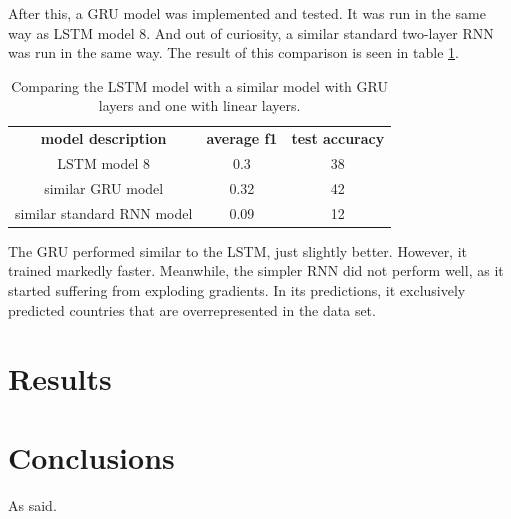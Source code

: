 \documentclass[runningheads]{llncs}
\begin{document}
After this, a GRU model was implemented and tested. It was run in the same way as LSTM model 8. And out of curiosity, a similar standard two-layer RNN was run in the same way. The result of this comparison is seen in table \ref{tab:GRU_LSTM_RNN_comp}.


\begin{table}[h!]
    \begin{center}
        \caption{Comparing the LSTM model with a similar model with GRU layers and one with linear layers.}
        \label{tab:GRU_LSTM_RNN_comp}
		\begin{tabularx}{.8\textwidth}{ | c | c | c |}
			\textbf{model description} & \textbf{average f1} & \textbf{test accuracy} \\
			LSTM model 8 & 0.3 & 38 \\
			similar GRU model & 0.32  & 42 \\
			similar standard RNN model & 0.09 & 12 \\
		\end{tabularx}  
    \end{center}
\end{table}

The GRU performed similar to the LSTM, just slightly better. However, it trained markedly faster. Meanwhile, the simpler RNN did not perform well, as it started suffering from exploding gradients. In its predictions, it exclusively predicted countries that are overrepresented in the data set. 

\section{Results}
\section{Conclusions}


As \cite{Alpher04} said.

\end{document}
